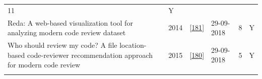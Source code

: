 \documentclass[]{book}
\begin{document}
\begin{longtable}[]{@{}llllll@{}}
\begin{minipage}[t]{0.07\columnwidth}
11\strut
\end{minipage} & \begin{minipage}[t]{0.08\columnwidth}\raggedright\strut
Y\strut
\end{minipage}\tabularnewline
\begin{minipage}[t]{0.47\columnwidth}\raggedright\strut
Reda: A web-based visualization tool for analyzing modern code review
dataset\strut
\end{minipage} & \begin{minipage}[t]{0.03\columnwidth}\raggedright\strut
2014\strut
\end{minipage} & \begin{minipage}[t]{0.13\columnwidth}\raggedright\strut
{[}\protect\hyperlink{ref-thongtanunam2014reda}{181}{]}\strut
\end{minipage} & \begin{minipage}[t]{0.06\columnwidth}\raggedright\strut
29-09-2018\strut
\end{minipage} & \begin{minipage}[t]{0.07\columnwidth}\raggedright\strut
8\strut
\end{minipage} & \begin{minipage}[t]{0.08\columnwidth}\raggedright\strut
Y\strut
\end{minipage}\tabularnewline
\begin{minipage}[t]{0.47\columnwidth}\raggedright\strut
Who should review my code? A file location-based code-reviewer
recommendation approach for modern code review\strut
\end{minipage} & \begin{minipage}[t]{0.03\columnwidth}\raggedright\strut
2015\strut
\end{minipage} & \begin{minipage}[t]{0.13\columnwidth}\raggedright\strut
{[}\protect\hyperlink{ref-thongtanunam2015should}{180}{]}\strut
\end{minipage} & \begin{minipage}[t]{0.06\columnwidth}\raggedright\strut
29-09-2018\strut
\end{minipage} & \begin{minipage}[t]{0.07\columnwidth}\raggedright\strut
5\strut
\end{minipage} & \begin{minipage}[t]{0.08\columnwidth}\raggedright\strut
Y\strut
\end{minipage}\tabularnewline
\begin{minipage}[t]{0.47\columnwidth}\raggedright\strut

\end{minipage}
\end{longtable}
\end{document}
